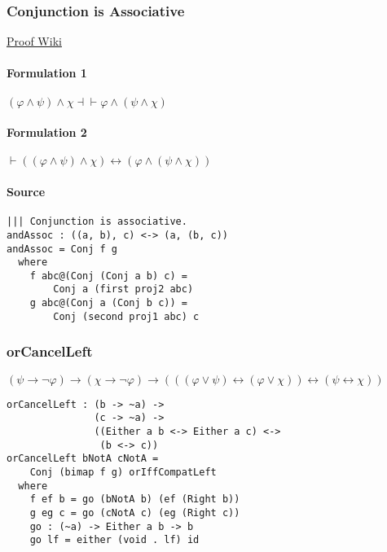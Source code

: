 \documentclass{acm_proc_article-sp}
\renewcommand{\iff}{\leftrightarrow}
\renewcommand{\implies}{\rightarrow}
\begin{document}
\subsubsection{Conjunction is
Associative}\label{conjunction-is-associative}

\href{https://proofwiki.org/wiki/Rule_of_Association/Conjunction}{Proof
Wiki}

\paragraph{Formulation 1}\label{formulation-1-1}

\((\varphi \land \psi) \land \chi \dashv\vdash \varphi \land (\psi \land \chi)\)

\paragraph{Formulation 2}\label{formulation-2-1}

\(\vdash ((\varphi \land \psi) \land \chi) \iff (\varphi \land (\psi \land \chi))\)

\paragraph{Source}\label{source-1}

\begin{verbatim}
||| Conjunction is associative.
andAssoc : ((a, b), c) <-> (a, (b, c))
andAssoc = Conj f g
  where
    f abc@(Conj (Conj a b) c) =
        Conj a (first proj2 abc)
    g abc@(Conj a (Conj b c)) =
        Conj (second proj1 abc) c
\end{verbatim}

\subsubsection{orCancelLeft}\label{orcancelleft}

\((\psi \implies \neg \varphi) \implies (\chi \implies \neg \varphi) \implies (((\varphi \lor \psi) \iff (\varphi \lor \chi)) \iff (\psi \iff \chi))\)

\begin{verbatim}
orCancelLeft : (b -> ~a) ->
               (c -> ~a) ->
               ((Either a b <-> Either a c) <->
                (b <-> c))
orCancelLeft bNotA cNotA =
    Conj (bimap f g) orIffCompatLeft
  where
    f ef b = go (bNotA b) (ef (Right b))
    g eg c = go (cNotA c) (eg (Right c))
    go : (~a) -> Either a b -> b
    go lf = either (void . lf) id
\end{verbatim}
\end{document}
